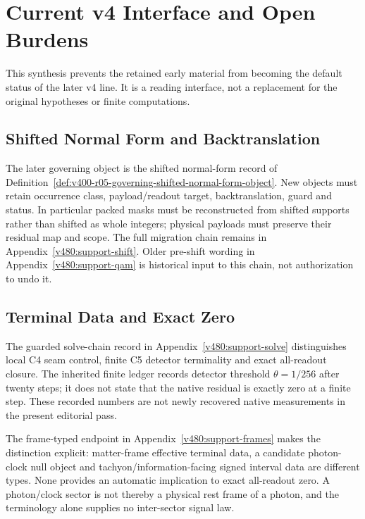 \section{Current v4 Interface and Open Burdens}
\label{v480:current-v4}

This synthesis prevents the retained early material from becoming the
default status of the later v4 line. It is a reading interface, not
a replacement for the original hypotheses or finite computations.

\subsection{Shifted Normal Form and Backtranslation}

The later governing object is the shifted normal-form record of
Definition~\ref{def:v400-r05-governing-shifted-normal-form-object}.
New objects must retain occurrence class, payload/readout target,
backtranslation, guard and status. In particular packed masks must
be reconstructed from shifted supports rather than shifted as whole
integers; physical payloads must preserve their residual map and scope.
The full migration chain remains in
Appendix~\ref{v480:support-shift}. Older pre-shift wording in
Appendix~\ref{v480:support-qam} is historical input to this chain,
not authorization to undo it.

\subsection{Terminal Data and Exact Zero}

The guarded solve-chain record in
Appendix~\ref{v480:support-solve} distinguishes local C4 seam control,
finite C5 detector terminality and exact all-readout closure. The
inherited finite ledger records detector threshold $\theta=1/256$
after twenty steps; it does not state that the native residual is
exactly zero at a finite step. These recorded numbers are not newly
recovered native measurements in the present editorial pass.

The frame-typed endpoint in
Appendix~\ref{v480:support-frames} makes the distinction explicit:
matter-frame effective terminal data, a candidate photon-clock null
object and tachyon/information-facing signed interval data are
different types. None provides an automatic implication to exact
all-readout zero. A photon/clock sector is not thereby a physical
rest frame of a photon, and the terminology alone supplies no
inter-sector signal law.

